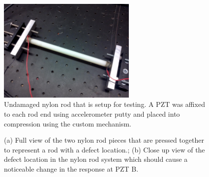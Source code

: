 \begin{figure}[ht!]
\centering
\includegraphics[width=0.6\textwidth]{eps_pics/nylonUncrackedFull}
\caption{Undamaged nylon rod that is setup for testing. A PZT was affixed to each rod end using accelerometer putty and placed into compression using the custom mechanism.
 	 \label{fig:nylonUncrackedFull}} 
\end{figure}

\begin{figure}
\begin{subfigmatrix}{2}
\end{subfigmatrix}

   \caption
   { \label{fig:nylonCrack}
(a) Full view of the two nylon rod pieces that are pressed together to represent a rod with a defect location.;
(b) Close up view of the defect location in the nylon rod system which should cause a noticeable change in the response at PZT B.
 }
   \end{figure}
   
